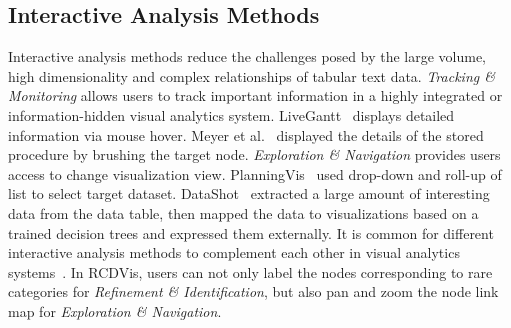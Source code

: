 \documentclass[a4paper,fleqn]{cas-dc}
\begin{document}
\subsection{Interactive Analysis Methods}
Interactive analysis methods reduce the challenges posed by the large volume, high dimensionality and complex relationships of tabular text data.
\textit{Tracking \& Monitoring} allows users to track important information in a highly integrated or information-hidden visual analytics system.
LiveGantt~\cite{Jo2014} displays detailed information via mouse hover. Meyer et al.~\cite{Meyer2013} displayed the details of the stored procedure by brushing the target node.
\textit{Exploration \& Navigation} provides users access to change visualization view. PlanningVis~\cite{sun2019planningvis} used drop-down and roll-up of list to select target dataset.
DataShot~\cite{wang2019datashot} extracted a large amount of interesting data from the data table, then mapped the data to visualizations based on a trained decision trees and expressed them externally.
It is common for different interactive analysis methods to complement each other in visual analytics systems~\cite{Qian2022,sun2019planningvis,Fellow2017}.
In RCDVis, users can not only label the nodes corresponding to rare categories for \textit{Refinement \& Identification}, but also pan and zoom the node link map for \textit{Exploration \& Navigation}.

\end{document}
